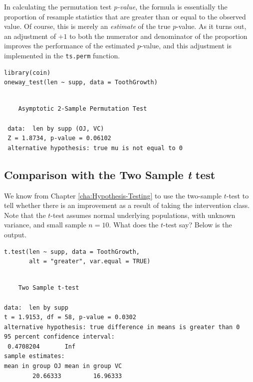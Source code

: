 \documentclass[captions=tableheading]{scrbook}
\begin{document}
\begin{rem}
In calculating the permutation test \emph{p-value}, the formula is essentially the proportion of resample statistics that are greater than or equal to the observed value. Of course, this is merely an \emph{estimate} of the true \(p\)-value. As it turns out, an adjustment of \(+1\) to both the numerator and denominator of the proportion improves the performance of the estimated \(p\)-value, and this adjustment is implemented in the \texttt{ts.perm} function.
\end{rem}



\begin{verbatim}
library(coin)
oneway_test(len ~ supp, data = ToothGrowth)
\end{verbatim}

\begin{verbatim}
 
 	Asymptotic 2-Sample Permutation Test
 
 data:  len by supp (OJ, VC) 
 Z = 1.8734, p-value = 0.06102
 alternative hypothesis: true mu is not equal to 0
\end{verbatim}
\subsection{Comparison with the Two Sample \emph{t} test}
\label{sec-13-4-1}


We know from Chapter \ref{cha:Hypothesis-Testing} to use the two-sample \(t\)-test to tell whether there is an improvement as a result of taking the intervention class. Note that the \(t\)-test assumes normal underlying populations, with unknown variance, and small sample \(n=10\). What does the \(t\)-test say? Below is the output. 


\begin{verbatim}
t.test(len ~ supp, data = ToothGrowth, 
       alt = "greater", var.equal = TRUE)
\end{verbatim}


\begin{verbatim}

	Two Sample t-test

data:  len by supp 
t = 1.9153, df = 58, p-value = 0.0302
alternative hypothesis: true difference in means is greater than 0 
95 percent confidence interval:
 0.4708204       Inf 
sample estimates:
mean in group OJ mean in group VC 
        20.66333         16.96333
\end{verbatim}
\end{document}
